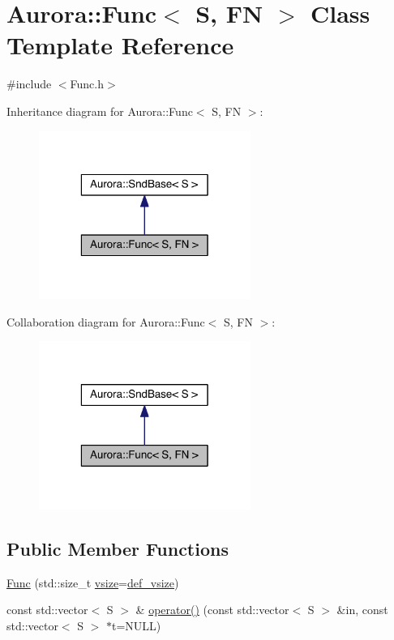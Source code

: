 \hypertarget{class_aurora_1_1_func}{}\section{Aurora\+:\+:Func$<$ S, FN $>$ Class Template Reference}
\label{class_aurora_1_1_func}


{\ttfamily \#include $<$Func.\+h$>$}



Inheritance diagram for Aurora\+:\+:Func$<$ S, FN $>$\+:\nopagebreak
\begin{figure}[H]
\begin{center}
\leavevmode
\includegraphics[width=196pt]{class_aurora_1_1_func__inherit__graph}
\end{center}
\end{figure}


Collaboration diagram for Aurora\+:\+:Func$<$ S, FN $>$\+:\nopagebreak
\begin{figure}[H]
\begin{center}
\leavevmode
\includegraphics[width=196pt]{class_aurora_1_1_func__coll__graph}
\end{center}
\end{figure}
\subsection*{Public Member Functions}
\begin{DoxyCompactItemize}
\item 
\hyperlink{class_aurora_1_1_func_a2a97c0f4eaf70c7e922876debeb14abe}{Func} (std\+::size\+\_\+t \hyperlink{class_aurora_1_1_snd_base_af9e21aaf411b17f7a8221c991ce5d291}{vsize}=\hyperlink{namespace_aurora_afaaddf667a06e7ce23c667a8b7295263}{def\+\_\+vsize})
\item 
const std\+::vector$<$ S $>$ \& \hyperlink{class_aurora_1_1_func_a83402c97421f1a82e818c4ab849dc47e}{operator()} (const std\+::vector$<$ S $>$ \&in, const std\+::vector$<$ S $>$ $\ast$t=N\+U\+LL)
\end{DoxyCompactItemize}



